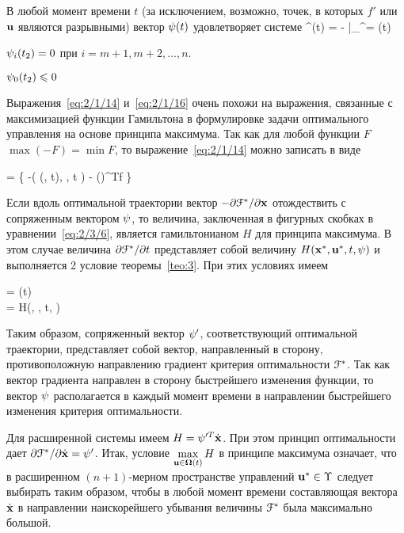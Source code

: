		\item
			В любой момент времени $t$ (за исключением, возможно, точек, в которых $f'$ или $\mathbf{u}$ являются разрывными) вектор $\mathbf{\psi}(t)$ удовлетворяет системе
				\dot{\m{\psi}}^\prime(t) = - \biggm|_{^\prime = \optX(t)} 
			\eeq
		
		\item
			$\mathbf{\psi}_i(t_2) = 0$ при $i= m+1, m+2, \ldots, n$.
		
		\item
			$\mathbf{\psi}_0(t_2) \leqslant 0$
	\eenum
\eteo

\br

Выражения~\ref{eq:2/1/14} и~\vref{eq:2/1/16} очень похожи на выражения, связанные с максимизацией функции Гамильтона в формулировке задачи оптимального управления на основе принципа максимума. Так как для любой функции $F$ $\max(-F) = \min F$, то выражение~\ref{eq:2/1/14} можно записать в виде

     =  \Bigl\{ -\funcL\bigl( (, t), , t \bigr) - \biggl(\biggr)^Tf \Bigr\} 
\eeq

Если вдоль оптимальной траектории вектор $-\partial {    \mathcal{F}  ^{*}  } / \partial {  \mathbf{x}  }$ отождествить с сопряженным вектором $\mathbf{\psi}$, то величина, заключенная в фигурных скобках в уравнении~\ref{eq:2/3/6}, является гамильтонианом $H$ для принципа максимума. В этом случае величина $\partial {    \mathcal{F}  ^{*}  } / \partial {t}$ представляет собой величину $H({\mathbf{x}^{*}}, {\mathbf{u}^{*}}, t, \mathbf{\psi})$ и выполняется 2 условие теоремы~\vref{teo:3}. При этих условиях имеем

\beqarr
    	 = \m{\psi}(t) \text{;} \\
    	 = \funcH \eqdef H(\optX, \optU, t, \m{\psi})
\eeqarr

Таким образом, сопряженный вектор $\mathbf{\psi}'$, соответствующий оптимальной траектории, представляет собой вектор, направленный в сторону, противоположную направлению градиент критерия оптимальности $\mathcal{F}^{*}$. Так как вектор градиента направлен в сторону быстрейшего изменения функции, то вектор $\mathbf{\psi}$ располагается в каждый момент времени в направлении быстрейшего изменения критерия оптимальности.

Для расширенной системы имеем $H = \mathbf{\psi}'^T\dot{\mathbf{x}}$. При этом принцип оптимальности дает $\partial {    \mathcal{F}  ^{*}  } / \partial {\dot{  \mathbf{x}  }} = \mathbf{\psi}'$. Итак, условие $\max\limits_{\mathbf{u} \in \mathbf{\Omega}(t)} H$ в принципе максимума означает, что в расширенном $(n+1)$-мерном пространстве управлений ${\mathbf{u}^{*}} \in \Upsilon$ следует выбирать таким образом, чтобы в любой момент времени составляющая вектора $\dot{\mathbf{x}}$ в направлении наискорейшего убывания величины $\mathcal{F}^{*}$ была максимально большой.

